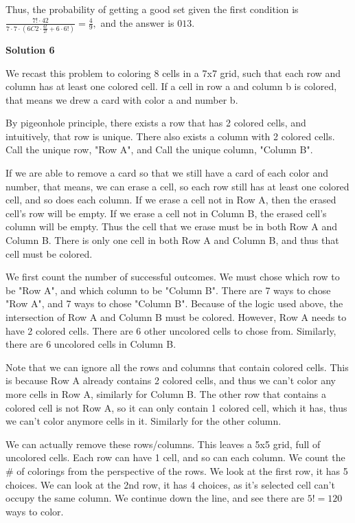 \begin{enumerate}
 Thus, the probability of getting a good set given the first condition is $\frac{ 7! \cdot 42  }{ 7 \cdot 7 \cdot \left( 6C2 \cdot \frac{6!}{2!} + 6 \cdot 6! \right) } = \frac{4}{9},$ and the answer is $\boxed{013}.$




\textbf{Solution 6}

We recast this problem to coloring 8 cells in a 7x7 grid, such that each row and column has at least one colored cell. If a cell in row a and column b is colored, that means we drew a card with color a and number b. 

 By pigeonhole principle, there exists a row that has 2 colored cells, and intuitively, that row is unique. There also exists a column with 2 colored cells. Call the unique row, "Row A", and Call the unique column, "Column B".

 If we are able to remove a card so that we still have a card of each color and number, that means, we can erase a cell, so each row still has at least one colored cell, and so does each column. If we erase a cell not in Row A, then the erased cell's row will be empty. If we erase a cell not in Column B, the erased cell's column will be empty. Thus the cell that we erase must be in both Row A and Column B. There is only one cell in both Row A and Column B, and thus that cell must be colored.

 We first count the number of successful outcomes. We must chose which row to be "Row A", and which column to be "Column B". There are 7 ways to chose "Row A", and 7 ways to chose "Column B". Because of the logic used above, the intersection of Row A and Column B must be colored. However, Row A needs to have 2 colored cells. There are 6 other uncolored cells to chose from. Similarly, there are 6 uncolored cells in Column B. 

 Note that we can ignore all the rows and columns that contain colored cells. This is because Row A already contains 2 colored cells, and thus we can't color any more cells in Row A, similarly for Column B. The other row that contains a colored cell is not Row A, so it can only contain 1 colored cell, which it has, thus we can't color anymore cells in it. Similarly for the other column.  

 We can actually remove these rows/columns. This leaves a 5x5 grid, full of uncolored cells. Each row can have 1 cell, and so can each column. We count the \# of colorings from the perspective of the rows. We look at the first row, it has 5 choices. We can look at the 2nd row, it has 4 choices, as it's selected cell can't occupy the same column. We continue down the line, and see there are $5! = 120$ ways to color.


\end{enumerate}
